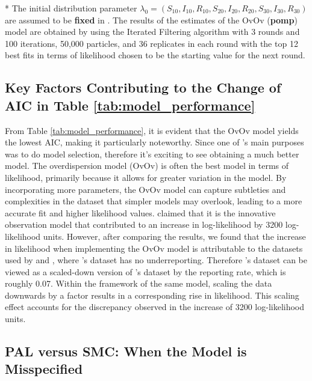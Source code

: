 \documentclass[10pt]{article}
\begin{document}
\begin{table}[htbp]
\begin{threeparttable}
\begin{tablenotes}
      \small
      \item[*] The initial distribution parameter \(\lambda_0 = (S_{10}, I_{10}, R_{10}, S_{20}, I_{20}, R_{20}, S_{30}, I_{30}, R_{30})\) are assumed to be \textbf{fixed} in \cite{wwr}. The results of the estimates of the OvOv (\textbf{pomp}) model are obtained by using the Iterated Filtering algorithm with 3 rounds and 100 iterations, 50,000 particles, and 36 replicates in each round with the top 12 best fits in terms of likelihood chosen to be the starting value for the next round. 
    \end{tablenotes}
  \end{threeparttable}
\end{table}



\subsection{Key Factors Contributing to the Change of AIC in Table \ref{tab:model_performance}}\label{section1}

From Table \ref{tab:model_performance}, it is evident that the OvOv model yields the lowest AIC, making it particularly noteworthy. Since one of \cite{stocks}'s main purposes was to do model selection, therefore it's exciting to see \cite{wwr} obtaining a much better model. The overdispersion model (OvOv) is often the best model in terms of likelihood, primarily because it allows for greater variation in the model. By incorporating more parameters, the OvOv model can capture subtleties and complexities in the dataset that simpler models may overlook, leading to a more accurate fit and higher likelihood values. \cite{wwr} claimed that it is the innovative observation model that contributed to an increase in log-likelihood by 3200 log-likelihood units. However, after comparing the results, we found that the increase in likelihood when implementing the OvOv model is attributable to the datasets used by \cite{wwr} and \cite{stocks}, where \cite{stocks}'s dataset has no underreporting. Therefore \cite{wwr}'s dataset can be viewed as a scaled-down version of \cite{stocks}'s dataset by the reporting rate, which is roughly 0.07. Within the framework of the same model, scaling the data downwards by a factor results in a corresponding rise in likelihood. This scaling effect accounts for the discrepancy observed in the increase of 3200 log-likelihood units.
\vspace{-2mm}
\subsection{PAL versus SMC: When the Model is Misspecified} \label{misspecified}
\end{document}
